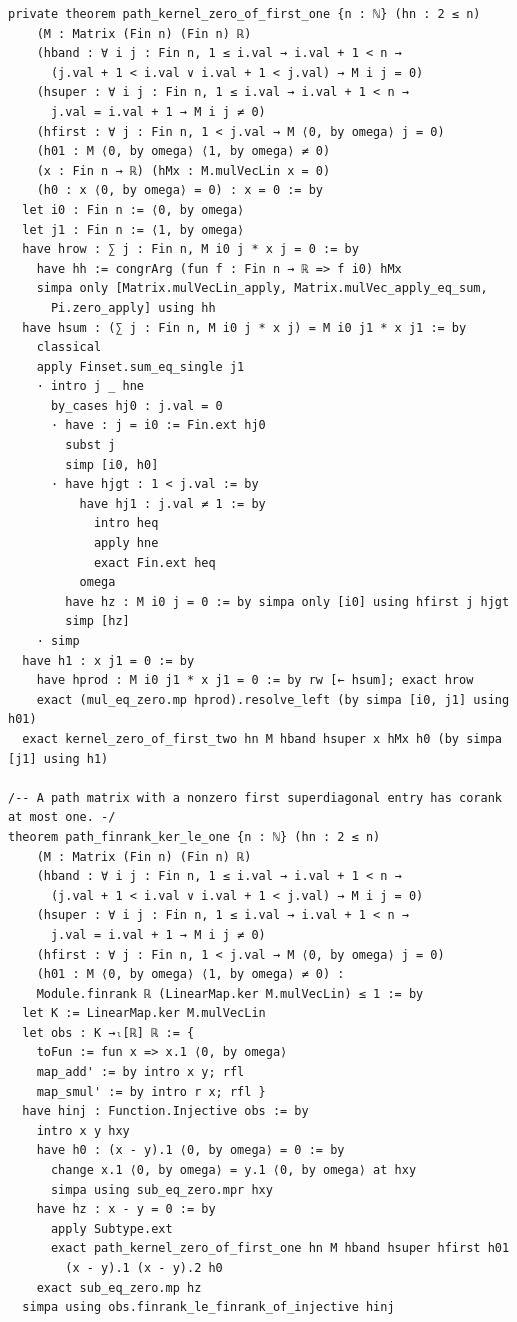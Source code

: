 \documentclass[11pt,a4paper]{article}
\begin{document}
\begin{Verbatim}[breaklines,breakanywhere,fontsize=\footnotesize]
private theorem path_kernel_zero_of_first_one {n : ℕ} (hn : 2 ≤ n)
    (M : Matrix (Fin n) (Fin n) ℝ)
    (hband : ∀ i j : Fin n, 1 ≤ i.val → i.val + 1 < n →
      (j.val + 1 < i.val ∨ i.val + 1 < j.val) → M i j = 0)
    (hsuper : ∀ i j : Fin n, 1 ≤ i.val → i.val + 1 < n →
      j.val = i.val + 1 → M i j ≠ 0)
    (hfirst : ∀ j : Fin n, 1 < j.val → M ⟨0, by omega⟩ j = 0)
    (h01 : M ⟨0, by omega⟩ ⟨1, by omega⟩ ≠ 0)
    (x : Fin n → ℝ) (hMx : M.mulVecLin x = 0)
    (h0 : x ⟨0, by omega⟩ = 0) : x = 0 := by
  let i0 : Fin n := ⟨0, by omega⟩
  let j1 : Fin n := ⟨1, by omega⟩
  have hrow : ∑ j : Fin n, M i0 j * x j = 0 := by
    have hh := congrArg (fun f : Fin n → ℝ => f i0) hMx
    simpa only [Matrix.mulVecLin_apply, Matrix.mulVec_apply_eq_sum,
      Pi.zero_apply] using hh
  have hsum : (∑ j : Fin n, M i0 j * x j) = M i0 j1 * x j1 := by
    classical
    apply Finset.sum_eq_single j1
    · intro j _ hne
      by_cases hj0 : j.val = 0
      · have : j = i0 := Fin.ext hj0
        subst j
        simp [i0, h0]
      · have hjgt : 1 < j.val := by
          have hj1 : j.val ≠ 1 := by
            intro heq
            apply hne
            exact Fin.ext heq
          omega
        have hz : M i0 j = 0 := by simpa only [i0] using hfirst j hjgt
        simp [hz]
    · simp
  have h1 : x j1 = 0 := by
    have hprod : M i0 j1 * x j1 = 0 := by rw [← hsum]; exact hrow
    exact (mul_eq_zero.mp hprod).resolve_left (by simpa [i0, j1] using h01)
  exact kernel_zero_of_first_two hn M hband hsuper x hMx h0 (by simpa [j1] using h1)

/-- A path matrix with a nonzero first superdiagonal entry has corank at most one. -/
theorem path_finrank_ker_le_one {n : ℕ} (hn : 2 ≤ n)
    (M : Matrix (Fin n) (Fin n) ℝ)
    (hband : ∀ i j : Fin n, 1 ≤ i.val → i.val + 1 < n →
      (j.val + 1 < i.val ∨ i.val + 1 < j.val) → M i j = 0)
    (hsuper : ∀ i j : Fin n, 1 ≤ i.val → i.val + 1 < n →
      j.val = i.val + 1 → M i j ≠ 0)
    (hfirst : ∀ j : Fin n, 1 < j.val → M ⟨0, by omega⟩ j = 0)
    (h01 : M ⟨0, by omega⟩ ⟨1, by omega⟩ ≠ 0) :
    Module.finrank ℝ (LinearMap.ker M.mulVecLin) ≤ 1 := by
  let K := LinearMap.ker M.mulVecLin
  let obs : K →ₗ[ℝ] ℝ := {
    toFun := fun x => x.1 ⟨0, by omega⟩
    map_add' := by intro x y; rfl
    map_smul' := by intro r x; rfl }
  have hinj : Function.Injective obs := by
    intro x y hxy
    have h0 : (x - y).1 ⟨0, by omega⟩ = 0 := by
      change x.1 ⟨0, by omega⟩ = y.1 ⟨0, by omega⟩ at hxy
      simpa using sub_eq_zero.mpr hxy
    have hz : x - y = 0 := by
      apply Subtype.ext
      exact path_kernel_zero_of_first_one hn M hband hsuper hfirst h01
        (x - y).1 (x - y).2 h0
    exact sub_eq_zero.mp hz
  simpa using obs.finrank_le_finrank_of_injective hinj


\end{Verbatim}
\end{document}
